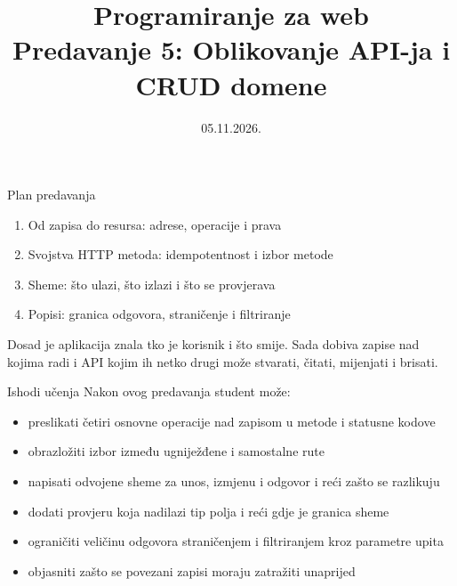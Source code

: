 

\title[Predavanje 5: Oblikovanje API-ja]{Programiranje za web \\ Predavanje 5: Oblikovanje API-ja i CRUD domene}
\date{05.11.2026.}



\frame{\titlepage}

\begin{frame}{Plan predavanja}
\begin{enumerate}
  \item Od zapisa do resursa: adrese, operacije i prava
  \item Svojstva HTTP metoda: idempotentnost i izbor metode
  \item Sheme: što ulazi, što izlazi i što se provjerava
  \item Popisi: granica odgovora, straničenje i filtriranje
\end{enumerate}

\vspace{0.3em}
Dosad je aplikacija znala tko je korisnik i što smije. Sada dobiva zapise nad kojima radi i API kojim ih netko drugi može stvarati, čitati, mijenjati i brisati.
\end{frame}

\begin{frame}{Ishodi učenja}
Nakon ovog predavanja student može:

\begin{itemize}
  \item preslikati četiri osnovne operacije nad zapisom u metode i statusne kodove
  \item obrazložiti izbor između ugniježđene i samostalne rute
  \item napisati odvojene sheme za unos, izmjenu i odgovor i reći zašto se razlikuju
  \item dodati provjeru koja nadilazi tip polja i reći gdje je granica sheme
  \item ograničiti veličinu odgovora straničenjem i filtriranjem kroz parametre upita
  \item objasniti zašto se povezani zapisi moraju zatražiti unaprijed
\end{itemize}
\end{frame}


